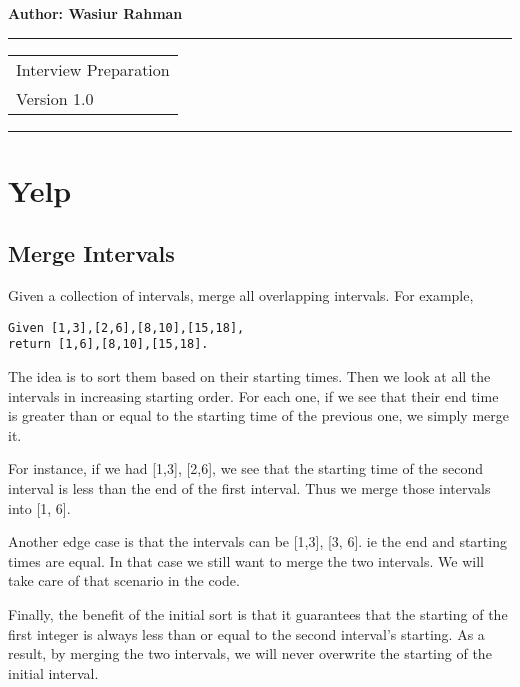 \documentclass{llncs}
\begin{document}
\thispagestyle{empty}
\begin{flushleft}
\LARGE\bfseries Author: Wasiur Rahman
\end{flushleft}
\rule{\textwidth}{1pt}
\vspace{2pt}
\begin{flushright}
\Huge
\begin{tabular}{@{}l}
Interview Preparation \\
{\Large Version 1.0}
\end{tabular}
\end{flushright}
\rule{\textwidth}{1pt}
\vfill
\newpage
\tableofcontents
\newpage
%
\section{Yelp}
\subsection{Merge Intervals}
Given a collection of intervals, merge all overlapping intervals.
For example,
\begin{verbatim}
Given [1,3],[2,6],[8,10],[15,18],
return [1,6],[8,10],[15,18].
\end{verbatim}

The idea is to sort them based on their starting times. Then we look at all the intervals in increasing starting order. For each one, if we see that their end time is greater than or equal to the starting time of the previous one, we simply merge it.

For instance, if we had [1,3], [2,6], we see that the starting time of the second interval is less than the end of the first interval. Thus we merge those intervals into [1, 6].

Another edge case is that the intervals can be [1,3], [3, 6]. ie the end and starting times are equal. In that case we still want to merge the two intervals. We will take care of that scenario in the code.

Finally, the benefit of the initial sort is that it guarantees that the starting of the first integer is always less than or equal to the second interval's starting. As a result, by merging the two intervals, we will never overwrite the starting of the initial interval.
\end{document}
